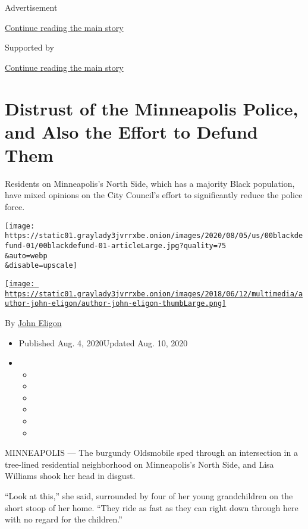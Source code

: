 Advertisement

\protect\hyperlink{after-top}{Continue reading the main story}

Supported by

\protect\hyperlink{after-sponsor}{Continue reading the main story}

\hypertarget{distrust-of-the-minneapolis-police-and-also-the-effort-to-defund-them}{%
\section{Distrust of the Minneapolis Police, and Also the Effort to
Defund
Them}\label{distrust-of-the-minneapolis-police-and-also-the-effort-to-defund-them}}

Residents on Minneapolis's North Side, which has a majority Black
population, have mixed opinions on the City Council's effort to
significantly reduce the police force.

\texttt{[image: https://static01.graylady3jvrrxbe.onion/images/2020/08/05/us/00blackdefund-01/00blackdefund-01-articleLarge.jpg?quality=75\\\&auto=webp\\\&disable=upscale]}

\href{https://www.nytimes3xbfgragh.onion/by/john-eligon}{\texttt{[image: https://static01.graylady3jvrrxbe.onion/images/2018/06/12/multimedia/author-john-eligon/author-john-eligon-thumbLarge.png]}}

By \href{https://www.nytimes3xbfgragh.onion/by/john-eligon}{John Eligon}

\begin{itemize}
\item
  Published Aug. 4, 2020Updated Aug. 10, 2020
\item
  \begin{itemize}
  \item
  \item
  \item
  \item
  \item
  \item
  \end{itemize}
\end{itemize}

MINNEAPOLIS --- The burgundy Oldsmobile sped through an intersection in
a tree-lined residential neighborhood on Minneapolis's North Side, and
Lisa Williams shook her head in disgust.

``Look at this,'' she said, surrounded by four of her young
grandchildren on the short stoop of her home. ``They ride as fast as
they can right down through here with no regard for the children.''

